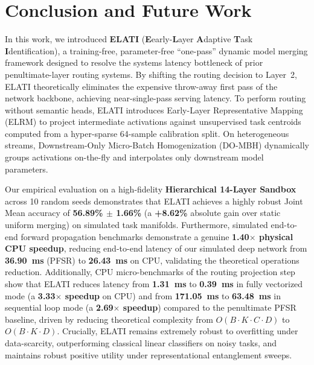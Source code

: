 \section{Conclusion and Future Work}
\label{sec:conclusion}

In this work, we introduced \textbf{ELATI} (\textbf{E}early-\textbf{L}ayer \textbf{A}daptive \textbf{T}ask \textbf{I}dentification), a training-free, parameter-free ``one-pass'' dynamic model merging framework designed to resolve the systems latency bottleneck of prior penultimate-layer routing systems.
By shifting the routing decision to Layer~2, ELATI theoretically eliminates the expensive throw-away first pass of the network backbone, achieving near-single-pass serving latency.
To perform routing without semantic heads, ELATI introduces Early-Layer Representative Mapping (ELRM) to project intermediate activations against unsupervised task centroids computed from a hyper-sparse 64-sample calibration split.
On heterogeneous streams, Downstream-Only Micro-Batch Homogenization (DO-MBH) dynamically groups activations on-the-fly and interpolates only downstream model parameters.

Our empirical evaluation on a high-fidelity \textbf{Hierarchical 14-Layer Sandbox} across 10 random seeds demonstrates that ELATI achieves a highly robust Joint Mean accuracy of \textbf{56.89\% $\pm$ 1.66\%} (a \textbf{+8.62\%} absolute gain over static uniform merging) on simulated task manifolds.
Furthermore, simulated end-to-end forward propagation benchmarks demonstrate a genuine \textbf{1.40$\times$ physical CPU speedup}, reducing end-to-end latency of our simulated deep network from \textbf{36.90~ms} (PFSR) to \textbf{26.43~ms} on CPU, validating the theoretical operations reduction.
Additionally, CPU micro-benchmarks of the routing projection step show that ELATI reduces latency from \textbf{1.31~ms} to \textbf{0.39~ms} in fully vectorized mode (a \textbf{3.33$\times$ speedup} on CPU) and from \textbf{171.05~ms} to \textbf{63.48~ms} in sequential loop mode (a \textbf{2.69$\times$ speedup}) compared to the penultimate PFSR baseline, driven by reducing theoretical complexity from $O(B \cdot K \cdot C \cdot D)$ to $O(B \cdot K \cdot D)$.
Crucially, ELATI remains extremely robust to overfitting under data-scarcity, outperforming classical linear classifiers on noisy tasks, and maintains robust positive utility under representational entanglement sweeps.

